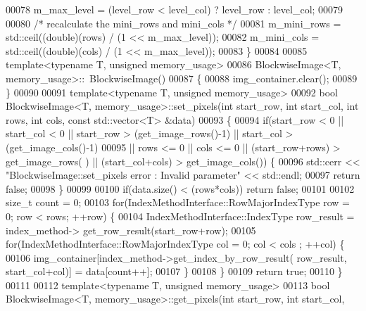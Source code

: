 \begin{DoxyCode}
00078         m\_max\_level = (level\_row < level\_col) ? level\_row : level\_col;
00079 
00080         \textcolor{comment}{/* recalculate the mini\_rows and mini\_cols */}
00081         m\_mini\_rows = std::ceil((\textcolor{keywordtype}{double})(rows) / (1 << m\_max\_level));
00082         m\_mini\_cols = std::ceil((\textcolor{keywordtype}{double})(cols) / (1 << m\_max\_level));
00083 \}
00084 
00085 \textcolor{keyword}{template}<\textcolor{keyword}{typename} T, \textcolor{keywordtype}{unsigned} memory\_usage>
00086 BlockwiseImage<T, memory_usage>::~BlockwiseImage()
00087 \{
00088         img\_container.clear();
00089 \}
00090 
00091 \textcolor{keyword}{template}<\textcolor{keyword}{typename} T, \textcolor{keywordtype}{unsigned} memory\_usage>
00092 \textcolor{keywordtype}{bool} BlockwiseImage<T, memory_usage>::set_pixels(\textcolor{keywordtype}{int} start\_row, \textcolor{keywordtype}{int} start\_col, \textcolor{keywordtype}{
      int} rows, \textcolor{keywordtype}{int} cols, \textcolor{keyword}{const} std::vector<T> &data)
00093 \{
00094         \textcolor{keywordflow}{if}(start\_row < 0 || start\_col < 0 || start\_row > (get\_image\_rows()-1) 
      || start\_col > (get\_image\_cols()-1)
00095                 || rows <= 0 || cols <= 0 || (start\_row+rows) > get\_image\_rows(
      ) || (start\_col+cols) > get\_image\_cols()) \{
00096                         std::cerr << \textcolor{stringliteral}{"BlockwiseImage::set\_pixels error :
       Invalid parameter"} << std::endl;
00097                         \textcolor{keywordflow}{return} \textcolor{keyword}{false};
00098         \}
00099 
00100         \textcolor{keywordflow}{if}(data.size() < (rows*cols))   \textcolor{keywordflow}{return} \textcolor{keyword}{false};
00101 
00102         \textcolor{keywordtype}{size\_t} count = 0;
00103         \textcolor{keywordflow}{for}(IndexMethodInterface::RowMajorIndexType row = 0; row < rows; ++row)
       \{
00104                 IndexMethodInterface::IndexType row\_result = index\_method->
      get\_row\_result(start\_row+row);
00105                 \textcolor{keywordflow}{for}(IndexMethodInterface::RowMajorIndexType col = 0; col < cols
      ; ++col) \{
00106                         img\_container[index\_method->get\_index\_by\_row\_result(
      row\_result, start\_col+col)] = data[count++];
00107                 \}
00108         \}
00109         \textcolor{keywordflow}{return} \textcolor{keyword}{true};
00110 \}
00111 
00112 \textcolor{keyword}{template}<\textcolor{keyword}{typename} T, \textcolor{keywordtype}{unsigned} memory\_usage>
00113 \textcolor{keywordtype}{bool} BlockwiseImage<T, memory_usage>::get_pixels(\textcolor{keywordtype}{int} start\_row, \textcolor{keywordtype}{int} start\_col, \textcolor{keywordtype}{
}
\end{DoxyCode}
